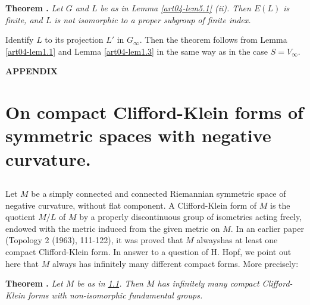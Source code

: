 \medskip
\noindent
{\bf Theorem .\label{art04-thm5.2}}
{\em Let $G$ and $L$ be as in Lemma \ref{art04-lem5.1} (ii). Then $E(L)$ is finite, and $L$ is not isomorphic to a proper subgroup of finite index.}
\smallskip

Identify $L$ to its projection $L'$ in $G_{\infty}$. Then the theorem follows from Lemma \ref{art04-lem1.1} and Lemma \ref{art04-lem1.3} in the same way as in the case $S=V_{\infty}$.

\bigskip
\begin{center}
{\bf APPENDIX}
\end{center}

\section{On compact Clifford-Klein forms of symmetric spaces with negative curvature.}\label{art04-sec6}

\subsection{}\label{art04-sec6.1}

Let $M$ be a simply connected and connected Riemannian symmetric space of negative curvature, without flat component. A Clifford-Klein form of $M$ is the quotient $M/L$ of $M$ by a properly discontinuous group of isometries acting freely, endowed with the metric induced from the given metric on $M$. In an earlier paper (Topology 2 (1963), 111-122), it was proved that $M$ always\pageoriginale has at least one compact Clifford-Klein form. In answer to a question of H. Hopf, we point out here that $M$ always has infinitely many different compact forms. More precisely:

\medskip
\noindent
{\bf Theorem .\label{art04-thm6.2}}
{\em Let $M$ be as in \ref{art04-sec6.1}. Then $M$ has infinitely many compact Clifford-Klein forms with non-isomorphic fundamental groups.}
\smallskip

